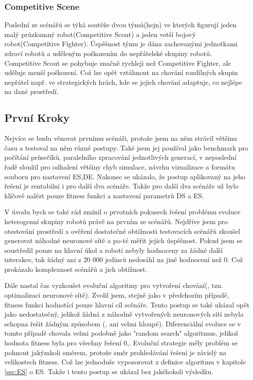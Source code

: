 \subsubsection{Competitive Scene}
Poslední ze scénářů se týká soutěže dvou týmů(hejn) ve kterých figurují jeden malý průzkumný robot(Competitive Scout) a jeden vetší bojový robot(Competitive Fighter). Úspěšnost týmu je dána zachovanými jednotkami zdraví robotů a uděleným poškozením do nepřátelské skupiny robotů. Competitive Scout se pohybuje značně rychleji než Competitive Fighter, ale uděluje menší poškození. Což lze opět vztáhnout na chování rozdílných skupin nepřátel např. ve strategických hrách, kde se jejich chování adaptuje, co nejlépe na dané prostředí. 
\subsection{První Kroky}
\par
Nejvíce se budu věnovat prvnímu scénáři, protože jsem na něm strávil většinu času a testoval na něm různé postupy. Také jsem jej používal  jako benchmark pro počítání průsečíků, paralelního zpracování jednotlivých generací, v neposlední řadě sloužil pro odhalení většiny chyb simulace, návrhu vizualizace a formátu souboru pro nastavení ES,DE. Nakonec se ukázalo, že postup aplikovaný na jeho řešení je rentabilní i pro další dva scénáře. Takže pro další dva scénáře už bylo klíčové nalézt pouze fitness funkci a nastavení parametrů DS a ES.
\par
V úvodu bych se také rád zmínil o prvotních pokusech řešení problému evoluce heterogenní skupiny robotů právě na prvním ze scénářů. Nejdříve jsem pro otestování prostředí a ověření dostatečné obtížnosti testovacích scénářů zkoušel generovat náhodné neuronové sítě a po-té měřit jejich úspěšnost. Pokud jsem se soustředil pouze na hlavní úkol a roboti nebyly hodnoceny za žádné další interakce, tak žádný ani z 20 000 jedinců nedosáhl na jiné hodnocení než 0. Což prokázalo komplexnost scénářů a jich obtížnost.
\par 
Dále nastal čas vyzkoušet evoluční algoritmy pro vytvoření chování(, tzn. optimalizaci neuronové sítě). Zvolil jsem, stejně jako v předchozím případě, fitness funkci hodnotící pouze hlavní cíl scénáře. Tento postup se také ukázal opět jako nedostatečný, jelikož žádná z náhodně vytvořených neuronových sítí nebyla schopna řešit žádným způsobem (, ani velmi hloupě). Diferenciální evoluce se v tomto případě chovala velmi podobně jako "random search" algoritmus, jelikož hodnota fitness byla pro  všechny řešení 0,. Evoluční strategie měly problém se pohnout jakýmkoli směrem, protože směr prohledávání řešení je závislý na velikostech fitness. Což lze jednoduše vypozorovat z definice algoritmu v kapitole \ref{sec:ES} o ES. Takže i tento postup se ukázal bez jakéhokoli výsledku. 
